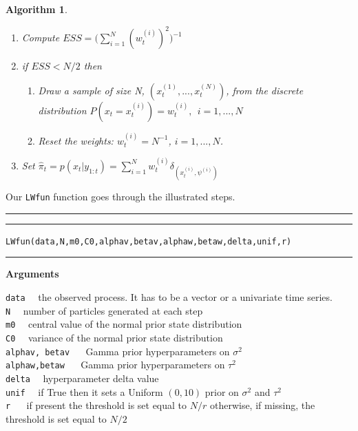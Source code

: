 \documentclass[
]{book}
\theoremstyle{break}
\theoremstyle{nonumberplain}
\newtheorem{algorithm}{Algorithm}[section]
\begin{document}
\begin{algorithm}
\begin{itemize}
\begin{enumerate}
\begin{itemize}
\item Draw $x_{t}^{(k)}$ from $N(x_{t-1}^{(I_k)},{\tau^2}^{(k)})$
\item Set  $\tilde{w}_{t}^{(k)} = \frac{f_{N}(y_{t}|x_{t}^{(k)},{\sigma^2}^{(k)})}{f_{N}(y_{t}|g(x_{t-1}^{(I_{k})},m_{v}^{(I_k)}))}$
\end{itemize}
\item Compute $ESS=\Bigg(\sum_{i=1}^{N}(w_{t}^{(i)})^{2}\Bigg)^{-1}$
\item if $ESS<N/2$ then
\begin{enumerate}
\item Draw a sample of size N, $(x_{t}^{(1)},...,x_{t}^{(N)})$, from the discrete distribution $P(x_{t}=x_{t}^{(i)})=w_{t}^{(i)},\ \ i=1,...,N$
\item Reset the weights: $w_{t}^{(i)}=N^{-1}$, $i=1,...,N$.
\end{enumerate}
\item Set $\hat{\pi}_{t}=p(x_{t}|y_{1:t})=\sum_{i=1}^{N}w_{t}^{(i)}\delta_{(x_{t}^{(i)},\psi^{(i)})}$
\end{enumerate}
\end{itemize}
\end{algorithm}

Our \texttt{LWfun} function goes through the illustrated steps.\\

\hrule
\hrule

\texttt{LWfun(data,N,m0,C0,alphav,betav,alphaw,betaw,delta,unif,r)}\\

\hrule

\textbf{Arguments}

\texttt{data} ~~the observed process. It has to be a vector or a
univariate time series.\\
\texttt{N} ~~number of particles generated at each step\\
\texttt{m0} ~~central value of the normal prior state distribution\\
\texttt{C0} ~~variance of the normal prior state distribution\\
\texttt{alphav, betav} ~~ Gamma prior hyperparameters on
\(\sigma^{2}\)\\
\texttt{alphaw,betaw} ~~ Gamma prior hyperparameters on \(\tau^{2}\)\\
\texttt{delta} ~~hyperparameter delta value\\
\texttt{unif} ~~if True then it sets a Uniform \((0,10)\) prior on
\(\sigma^{2}\) and \(\tau^{2}\)\\
\texttt{r} ~~ if present the threshold is set equal to \(N/r\)
otherwise, if missing, the threshold is set equal to \(N/2\)
\end{document}
